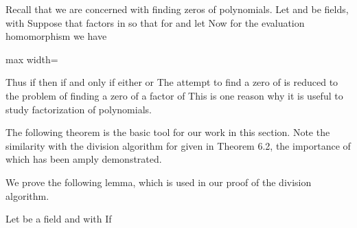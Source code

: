 \documentclass[11pt,oneside]{article}
\begin{document}
\fi
\renewcommand{\BookFooter}{Section 28 Factorization of Polynomials over a Field}
\ifdefined\BookMaster\else\setcounter{page}{228}\fi
\BookNarrativetrue

\begin{BookBody}


\noindent Recall that we are concerned with finding zeros of polynomials. Let  and  be fields, with  Suppose that  factors in  so that  for  and let  Now for the evaluation homomorphism \BookInline{\phi _{\alpha },\allowbreak } we have

\begin{center}\begin{adjustbox}{max width=\linewidth}\end{adjustbox}\end{center}

\noindent Thus if  then  if and only if either  or  The attempt to find a zero of  is reduced to the problem of finding a zero of a factor of  This is one reason why it is useful to study factorization of polynomials.


\noindent The following theorem is the basic tool for our work in this section. Note the similarity with the division algorithm for  given in Theorem 6.2, the importance of which has been amply demonstrated.

We prove the following lemma, which is used in our proof of the division algorithm.

 Let  be a field and  with  If


\end{BookBody}
\end{document}
